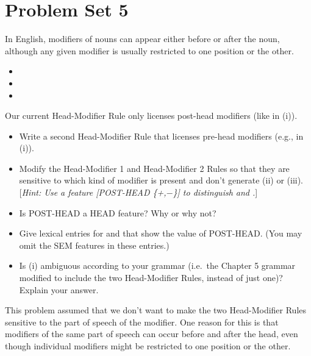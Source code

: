 \documentclass[a4paper,landscape,headrule,footrule]{foils}
\begin{document}
\section[Problem Set 5: two kinds of modifiers, number names (SWB 5.1, 5.3)]{Problem Set 5}

In English, modifiers of nouns can appear either
before or after the noun, although any given modifier is usually
restricted to one position or the other.

\begin{itemize}
\item[(i)] 
\item[(ii)]  
\item[(iii)]  
\end{itemize}
%
Our current Head-Modifier Rule only licenses post-head modifiers
(like  in (i)).

\begin{itemize}
\item[A.] Write a second Head-Modifier Rule that licenses
pre-head modifiers
(e.g.,  in (i)).
\item[B.] Modify the Head-Modifier 1 and Head-Modifier 2 Rules so that
they are sensitive to which kind of modifier is present and don't
generate (ii) or (iii).  [\textsl{Hint: Use a feature
{\rm [}POST-HEAD \{+,$-$\}{\rm ]} to distinguish  and .}]
\item[C.] Is POST-HEAD a HEAD feature? Why or why not?
\item[D.] Give lexical entries for  and  that show
the value of POST-HEAD. (You may omit the SEM features in these entries.)
\item[E.] Is (i) ambiguous according to your grammar (i.e.\
the Chapter 5 grammar modified to include the two Head-Modifier Rules,
instead of just one)? Explain your answer.
\end{itemize}

This problem assumed that we don't want to make the two Head-Modifier
Rules sensitive to the part of speech of the modifier.  One reason for
this is that modifiers of the same part of speech can occur before and
after the head, even though individual modifiers might be restricted
to one position or the other.
\end{document}
